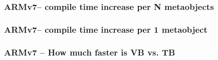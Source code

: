 \documentclass[compress,table,xcolor=table]{beamer}
\begin{document}
\begin{frame}
  \frametitle{ARMv7-- compile time increase per N metaobjects}
\end{frame}
\begin{frame}
  \frametitle{ARMv7-- compile time increase per 1 metaobject}
\end{frame}
\begin{frame}
  \frametitle{ARMv7 -- How much faster is VB vs. TB}
\end{frame}
\end{document}
